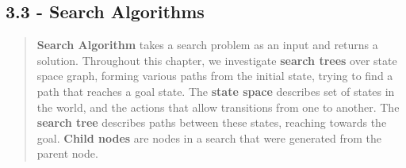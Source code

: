 \documentclass{article}
\begin{document}
\subsection{3.3 - Search Algorithms}
\begin{quote}
    \textbf{Search Algorithm} takes a search problem as an input and returns a solution. Throughout this chapter, we investigate \textbf{search trees} over state space graph,
    forming various paths from the initial state, trying to find a path that reaches a goal state. The \textbf{state space} describes set of states in the world, and the actions that allow
    transitions from one to another. The \textbf{search tree} describes paths between these states, reaching towards the goal. \textbf{Child nodes} are nodes in a search that were generated from the
    parent node.


\end{quote}
\end{document}
